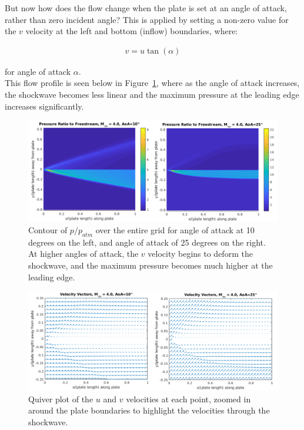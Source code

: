 \documentclass[10pt,a4paper]{article}
\begin{document}
\FloatBarrier


But now how does the flow change when the plate is set at an angle of attack, rather than zero incident angle? This is applied by setting a non-zero value for the $v$ velocity at the left and bottom (inflow) boundaries, where:

\begin{align*}
v = u \tan (\alpha)
\end{align*}

for angle of attack $\alpha$.\\

This flow profile is seen below in Figure~\ref{fig:TwoPlate_PresMap_Combined}, where as the angle of attack increases, the shockwave becomes less linear and the maximum pressure at the leading edge increases significantly.


\FloatBarrier

\begin{figure}[!htb]
	\begin{center}
		\includegraphics[scale=0.45]{images/TwoPlate_PresMap_Combined.png} 
		\caption{Contour of $p/p_{atm}$ over the entire grid for angle of attack at 10 degrees on the left, and angle of attack of 25 degrees on the right. At higher angles of attack, the $v$ velocity begins to deform the shockwave, and the maximum pressure becomes much higher at the leading edge.}
		\label{fig:TwoPlate_PresMap_Combined}
	\end{center}
\end{figure}



\begin{figure}[!htb]
	\begin{center}
		\includegraphics[scale=0.45]{images/TwoPlate_VelocityVectors_Combined.png} 
		\caption{Quiver plot of the $u$ and $v$ velocities at each point, zoomed in around the plate boundaries to highlight the velocities through the shockwave.}
		\label{fig:TwoPlate_VelocityVectors_Combined}
	\end{center}
\end{figure}
\end{document}
